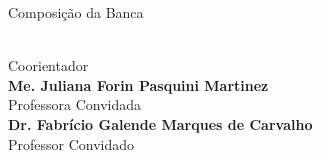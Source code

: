 \begin{folhadeaprovacao}

  \begin{center}
    {\ABNTEXchapterfont\large\imprimirautor}

    \vspace*{\fill}\vspace*{\fill}
    \begin{center}
      \ABNTEXchapterfont\bfseries\Large\imprimirtitulo
    \end{center}
    \vspace*{\fill}

    \hspace{.45\textwidth}
    \begin{minipage}{.5\textwidth}
        \imprimirpreambulo
    \end{minipage}%
    \vspace*{\fill}

    Composição da Banca
   \end{center}

   \begin{center}
   {\textbf{\imprimircoorientador} \\ Coorientador\\\vspace*{0.5cm}}
   {\textbf{Me. Juliana Forin Pasquini Martinez} \\ Professora Convidada\\\vspace*{0.5cm}}
   {\textbf{Dr. Fabrício Galende Marques de Carvalho} \\ Professor Convidado\\\vspace*{0.5cm}}

\end{center}   
   \begin{center}
    \vspace*{0.5cm}
    {\large\imprimirlocal}
    \par
    {\large\imprimirdata}
    \vspace*{1cm}
  \end{center}

\end{folhadeaprovacao}
